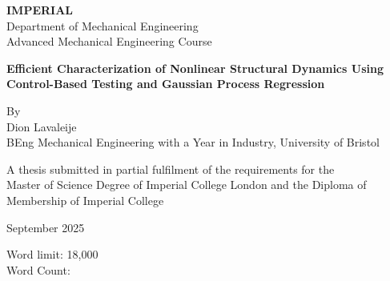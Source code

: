 \begin{titlepage}
\thispagestyle{empty}
\begin{center}

\Large\textbf{IMPERIAL}\\[2mm]
\large Department of Mechanical Engineering\\
Advanced Mechanical Engineering Course

\vspace*{25mm}
{\Huge\bfseries Efficient Characterization of Nonlinear Structural Dynamics Using Control-Based Testing and Gaussian Process Regression \par}

%

\vspace{6mm}
{\Large By}\\[2mm]
{\Large Dion Lavaleije}\\[2mm]
{\large BEng Mechanical Engineering with a Year in Industry, University of Bristol}

\vfill
\begin{minipage}{0.9\textwidth}\centering
A thesis submitted in partial fulfilment of the requirements for the\\
Master of Science Degree of Imperial College London and the Diploma of Membership of Imperial College
\end{minipage}

\vspace{15mm}
{\Large September 2025}

\vspace{8mm}
\begin{minipage}{0.9\textwidth}\centering
Word limit: 18{,}000 \\
Word Count:
\end{minipage}

\end{center}
\end{titlepage}
